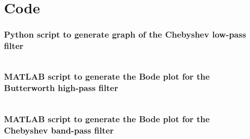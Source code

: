\documentclass[a4paper, onecolumn, 12pt]{IEEEtran}
\begin{document}
%
%

\FloatBarrier


\newpage
\appendices

\section{Code}
\label{app:code}

\subsubsection{Python script to generate graph of the Chebyshev low-pass filter}
\label{sec:code_chebychev}
  \begin{mdframed}
    \inputminted{python}{./code/practical_3.py}
  \end{mdframed}

\subsubsection{MATLAB script to generate the Bode plot for the Butterworth high-pass filter}
\begin{mdframed}
  \inputminted{Matlab}{./code/Hf.m}
\end{mdframed}

\subsubsection{MATLAB script to generate the Bode plot for the Chebyshev band-pass filter}
\begin{mdframed}
  \inputminted{Matlab}{./code/BP_Filter.m}
\end{mdframed}
\end{document}
